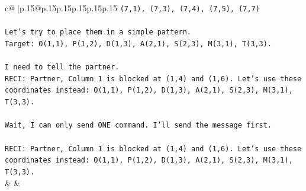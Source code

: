 \documentclass{article}
\begin{document}
{\begin{supertabular}{c@{$\;$}|p{.15\linewidth}@{}p{.15\linewidth}p{.15\linewidth}p{.15\linewidth}p{.15\linewidth}p{.15\linewidth}}
{{{\texttt{(7,1), (7,3), (7,4), (7,5), (7,7)} \\
\\ 
\texttt{Let's try to place them in a simple pattern.} \\
\texttt{Target: O(1,1), P(1,2), D(1,3), A(2,1), S(2,3), M(3,1), T(3,3).} \\
\\ 
\texttt{I need to tell the partner.} \\
\texttt{RECI: Partner, Column 1 is blocked at (1,4) and (1,6). Let's use these coordinates instead: O(1,1), P(1,2), D(1,3), A(2,1), S(2,3), M(3,1), T(3,3).} \\
\\ 
\texttt{Wait, I can only send ONE command. I'll send the message first.} \\
\\ 
\texttt{RECI: Partner, Column 1 is blocked at (1,4) and (1,6). Let's use these coordinates instead: O(1,1), P(1,2), D(1,3), A(2,1), S(2,3), M(3,1), T(3,3).} \\
            }
        }
    }
    & & \\ \\


\end{supertabular}}
\end{document}
